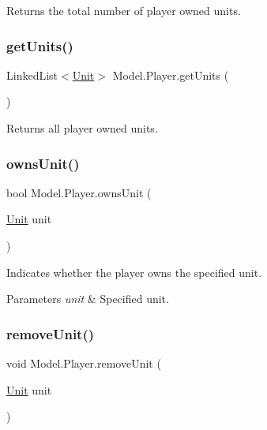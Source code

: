 Returns the total number of player owned units. \hypertarget{class_model_1_1_player_a3c61df9a7f3755ed7355e4a3cd4e685a}{}\label{class_model_1_1_player_a3c61df9a7f3755ed7355e4a3cd4e685a} 
\subsubsection{\texorpdfstring{get\+Units()}{getUnits()}}
{\footnotesize\ttfamily Linked\+List$<$\hyperlink{interface_model_1_1_unit_module_1_1_unit}{Unit}$>$ Model.\+Player.\+get\+Units (\begin{DoxyParamCaption}{ }\end{DoxyParamCaption})\hspace{0.3cm}{\ttfamily [inline]}}

Returns all player owned units. \hypertarget{class_model_1_1_player_a13d973c52472d7f54e4a3451ae16236e}{}\label{class_model_1_1_player_a13d973c52472d7f54e4a3451ae16236e} 
\subsubsection{\texorpdfstring{owns\+Unit()}{ownsUnit()}}
{\footnotesize\ttfamily bool Model.\+Player.\+owns\+Unit (\begin{DoxyParamCaption}\item[{\hyperlink{interface_model_1_1_unit_module_1_1_unit}{Unit}}]{unit }\end{DoxyParamCaption})\hspace{0.3cm}{\ttfamily [inline]}}

Indicates whether the player owns the specified unit. 
\begin{DoxyParams}{Parameters}
{\em unit} & Specified unit. \\
\hline
\end{DoxyParams}
\hypertarget{class_model_1_1_player_a3f76bd1d64c2e53f7d70842140a703b3}{}\label{class_model_1_1_player_a3f76bd1d64c2e53f7d70842140a703b3} 
\subsubsection{\texorpdfstring{remove\+Unit()}{removeUnit()}}
{\footnotesize\ttfamily void Model.\+Player.\+remove\+Unit (\begin{DoxyParamCaption}\item[{\hyperlink{interface_model_1_1_unit_module_1_1_unit}{Unit}}]{unit }\end{DoxyParamCaption})\hspace{0.3cm}{\ttfamily [inline]}}

